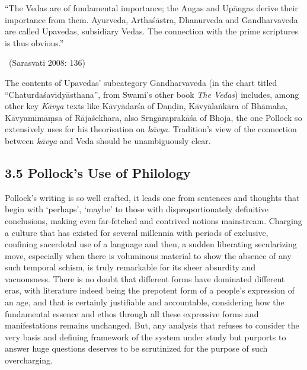 \begin{myquote}
“The Vedas are of fundamental importance; the Angas and Upāngas derive their importance from them. Ayurveda, Arthaśāstra, Dhanurveda and Gandharvaveda are called Upavedas, subsidiary Vedas. The connection with the prime scriptures is thus obvious.” 

~\hfill (Sarasvati 2008: 136)
\end{myquote}

The contents of Upavedas’ subcategory Gandharvaveda (in the chart titled “Chaturdaśavidyāsthana”, from Swami’s other book \textit{The Vedas}) includes, among other key \textit{Kāvya} texts like Kāvyādarśa of Daṇḍin, Kāvyālaṅkāra of Bhāmaha, Kāvyamīmāṃsa of Rājaśekhara, also Srngāraprakāśa of Bhoja, the one Pollock so extensively uses for his theorisation on \textit{kāvya}. Tradition’s view of the connection between \textit{kāvya} and Veda should be unambiguously clear.


\subsection*{3.5 Pollock’s Use of Philology}

Pollock’s writing is so well crafted, it leads one from sentences and thoughts that begin with ‘perhaps’, ‘maybe’ to those with disproportionately definitive conclusions, making even far-fetched and contrived notions mainstream. Charging a culture that has existed for several millennia with periods of exclusive, confining sacerdotal use of a language and then, a sudden liberating secularizing move, especially when there is voluminous material to show the absence of any such temporal schism, is truly remarkable for its sheer absurdity and vacuousness. There is no doubt that different forms have dominated different eras, with literature indeed being the prepotent form of a people’s expression of an age, and that is certainly justifiable and accountable, considering how the fundamental essence and ethos through all these expressive forms and manifestations remains unchanged. But, any analysis that refuses to consider the very basis and defining framework of the system under study but purports to answer huge questions deserves to be scrutinized for the purpose of such overcharging.

